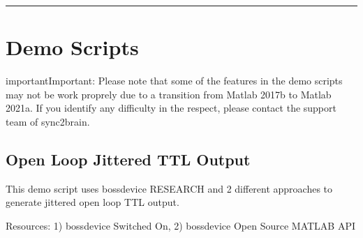 \documentclass[letterpaper,10pt,english]{sphinxmanual}
\begin{document}
\bigskip\hrule\bigskip



\chapter{Demo Scripts}
\label{\detokenize{5_demo_scripts:demo-scripts}}\label{\detokenize{5_demo_scripts::doc}}
\begin{sphinxadmonition}{important}{Important:}
\sphinxAtStartPar
Please note that some of the features in the demo scripts may not be work proprely due to a transition from Matlab 2017b to Matlab 2021a. If you identify any difficulty in the respect, please contact the support team of sync2brain.
\end{sphinxadmonition}


\section{Open Loop Jittered TTL Output}
\label{\detokenize{5_demo_scripts:open-loop-jittered-ttl-output}}
\sphinxAtStartPar
This demo script uses bossdevice RESEARCH and 2 different approaches to generate jittered open loop TTL output.

\sphinxAtStartPar
Resources: 1) bossdevice Switched On, 2) bossdevice Open Source MATLAB API
\end{document}
